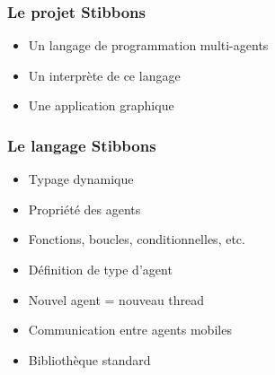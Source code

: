 \begin{frame}
\frametitle{Le projet Stibbons}
\begin{itemize}
	\item Un langage de programmation multi-agents
	\item Un interprète de ce langage
	\item Une application graphique
\end{itemize}
\end{frame}

\begin{frame}
\frametitle{Le langage Stibbons}
\begin{itemize}
        \item Typage dynamique
        \item Propriété des agents
        \item Fonctions, boucles, conditionnelles, etc.
        \item Définition de type d'agent
        \item Nouvel agent = nouveau thread
        \item Communication entre agents mobiles
        \item Bibliothèque standard
\end{itemize}
\end{frame}
